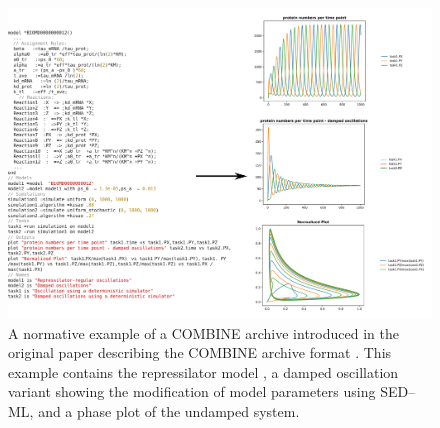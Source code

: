 \documentclass[10pt,letterpaper]{article}
\begin{document}
\begin{figure}
  \includegraphics[width=\textwidth]{fig-bergmann2014.pdf}
  \caption{ A normative example of a COMBINE archive introduced  in the original paper describing the COMBINE archive format \cite{bergmann2014combine}. This example contains the repressilator model \cite{elowitz2000synthetic}, a damped oscillation variant showing the modification of model parameters using SED--ML, and a phase plot of the undamped system. }
  \label{fig:bergmann2014}
\end{figure}

\clearpage
\end{document}
